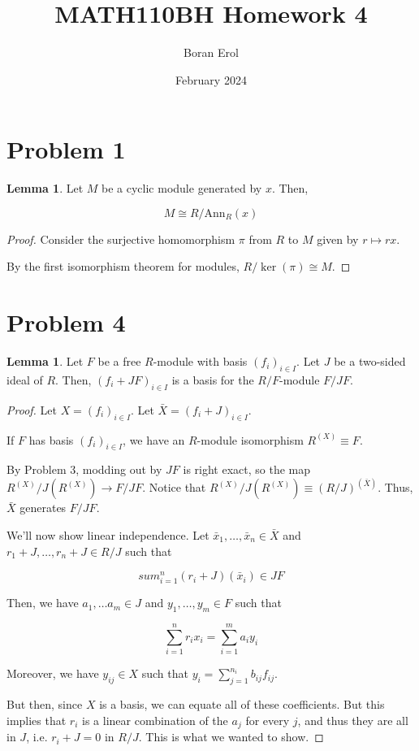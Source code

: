 \documentclass{article}
\title{MATH110BH Homework 4}
\date{February 2024}
\author{Boran Erol}
\theoremstyle{definition}
\newtheorem{lemma}[theorem]{Lemma}
\begin{document}
\maketitle

\section{Problem 1}

\begin{lemma}\label{cyclic_module_iso_to_r_mod_annihiliator}
    Let $ M $ be a cyclic module generated by $ x $. Then, 

    \[ M \cong R/\text{Ann}_{R}(x) \]
\end{lemma}
\begin{proof}
    Consider the surjective homomorphism $ \pi $ from $ R $ to $ M $ given by $ r \mapsto rx $.

    By the first isomorphism theorem for modules, $ R/ \ker(\pi) \cong M $.
\end{proof}


\section{Problem 4}

\begin{lemma}
    Let $ F $ be a free $ R $-module with basis $ (f_{i})_{i \in I} $.
    Let $ J $ be a two-sided ideal of $ R $.
    Then, $ (f_{i} + JF)_{i \in I} $ is a basis for the $ R/F $-module $ F/JF $. 
\end{lemma}
\begin{proof}
    Let $ X = (f_{i})_{i \in I} $.
    Let $ \bar{X} = (f_{i} + J)_{i \in I} $.

    If $ F $ has basis $ (f_{i})_{i \in I} $, we have an $ R $-module isomorphism 
    $ R^{(X)} \equiv F $.

    By Problem 3, modding out by $ JF $ is right exact, so the map $ R^{(X)} / J (R^{(X)}) \to F/JF $.
    Notice that $ R^{(X)} / J (R^{(X)}) \equiv (R/J)^{(\bar{X})} $. Thus, $ \bar{X} $ generates $ F/JF $.

    We'll now show linear independence.
    Let $ \bar{x}_{1}, \ldots, \bar{x}_{n} \in \bar{X} $ and $ r_{1} + J,  \ldots, r_{n} + J \in R/J $ such that

    \[ sum_{i = 1}^{n} (r_{i} + J)(\bar{x}_{i}) \in JF \]

    Then, we have $ a_{1}, \ldots a_{m} \in J $ and $ y_{1}, \ldots, y_{m} \in F $ such that

    \[ \sum_{i = 1}^{n} r_{i}x_{i} = \sum_{i = 1}^{m} a_{i}y_{i} \]

    Moreover, we have $ y_{ij} \in X $ such that $ y_{i} = \sum_{j = 1}^{n_{i}} b_{ij} f_{ij} $.

    But then, since $ X $ is a basis, we can equate all of these coefficients. But this implies that $ r_{i} $
    is a linear combination of the $ a_{j} $ for every $ j $, and thus they are all in $ J $, i.e. $ r_{i} + J = 0 $
    in $ R/J $. This is what we wanted to show.
\end{proof}
\end{document}
